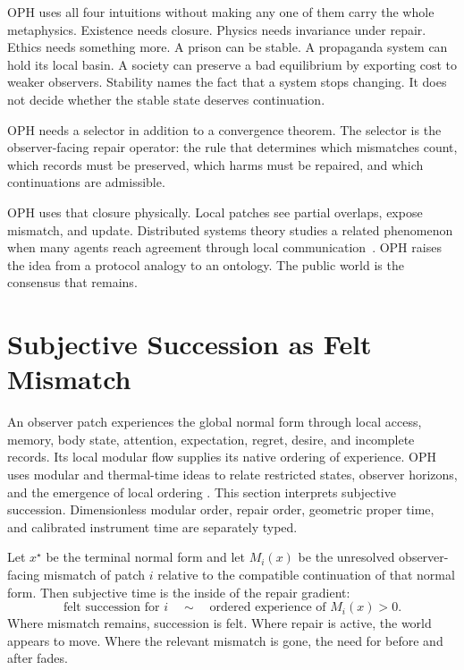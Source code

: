 \documentclass[11pt]{article}
\theoremstyle{remark}
\theoremstyle{plain}
\begin{document}
OPH uses all four intuitions without making any one of them carry the whole
metaphysics. Existence needs closure. Physics needs invariance under repair.
Ethics needs something more. A prison can be stable. A propaganda system can
hold its local basin. A society can preserve a bad equilibrium by exporting cost
to weaker observers. Stability names the fact that a system stops changing. It
does not decide whether the stable state deserves continuation.

OPH needs a selector in addition to a convergence theorem. The
selector is the observer-facing repair operator: the rule that determines which
mismatches count, which records must be preserved, which harms must be repaired,
and which continuations are admissible.

OPH uses that closure physically. Local patches see partial overlaps, expose
mismatch, and update. Distributed systems theory
studies a related phenomenon when many agents reach agreement through local
communication~\cite{Olfati2007,Lamport1982}. OPH raises the idea from a
protocol analogy to an ontology. The public world is the consensus that remains.

\section{Subjective Succession as Felt Mismatch}

An observer patch experiences the global normal form through local access,
memory, body state, attention, expectation, regret, desire, and incomplete
records. Its local modular flow supplies its native ordering of experience.
OPH uses modular and thermal-time ideas to relate restricted states,
observer horizons, and the emergence of local ordering
\cite{OPHObservers,ConnesRovelli1994,PageWootters1983}.
This section interprets subjective succession. Dimensionless modular order,
repair order, geometric proper time, and calibrated instrument time are
separately typed.

Let \(x^\star\) be the terminal normal form and let \(M_i(x)\) be the unresolved
observer-facing mismatch of patch \(i\) relative to the compatible continuation
of that normal form. Then subjective time is the inside of the repair gradient:
\[
\boxed{
\text{felt succession for }i \quad\sim\quad \text{ordered experience of } M_i(x)>0 .
}
\]
Where mismatch remains, succession is felt. Where repair is active, the world
appears to move. Where the relevant mismatch is gone, the need for before and
after fades.
\end{document}
